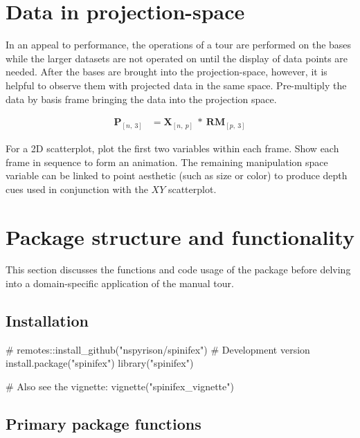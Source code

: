 \hypertarget{sec:display}{%
\section{Data in projection-space}\label{sec:display}}

In an appeal to performance, the operations of a tour are performed on
the bases while the larger datasets are not operated on until the
display of data points are needed. After the bases are brought into the
projection-space, however, it is helpful to observe them with projected
data in the same space. Pre-multiply the data by basis frame bringing
the data into the projection space.

\begin{align*}
  \textbf{P}_{[n,~3]} &= \textbf{X}_{[n,~p]} ~*~ \textbf{RM}_{[p,~3]}
\end{align*}

For a 2D scatterplot, plot the first two variables within each frame.
Show each frame in sequence to form an animation. The remaining
manipulation space variable can be linked to point aesthetic (such as
size or color) to produce depth cues used in conjunction with the \(XY\)
scatterplot.

\hypertarget{sec:usage}{%
\section{Package structure and functionality}\label{sec:usage}}

This section discusses the functions and code usage of the package
before delving into a domain-specific application of the manual tour.

\hypertarget{installation}{%
\subsection{Installation}\label{installation}}

\begin{Schunk}
\begin{Sinput}
# remotes::install_github("nspyrison/spinifex") # Development version
install.package("spinifex")
library("spinifex")

# Also see the vignette: 
vignette("spinifex_vignette")
\end{Sinput}
\end{Schunk}

\hypertarget{primary-package-functions}{%
\subsection{Primary package functions}\label{primary-package-functions}}

